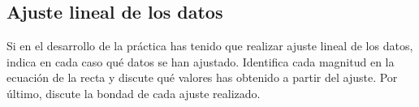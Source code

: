 \documentclass[a4paper,11pt]{article}
\begin{document}
\subsection{Ajuste lineal de los datos}

Si en el desarrollo de la práctica has tenido que realizar ajuste lineal de los datos, indica en cada caso qué datos se han ajustado. Identifica cada magnitud en la ecuación de la recta y discute qué valores has obtenido a partir del ajuste. Por último, discute la bondad de cada ajuste realizado.

\printbibliography
\end{document}
